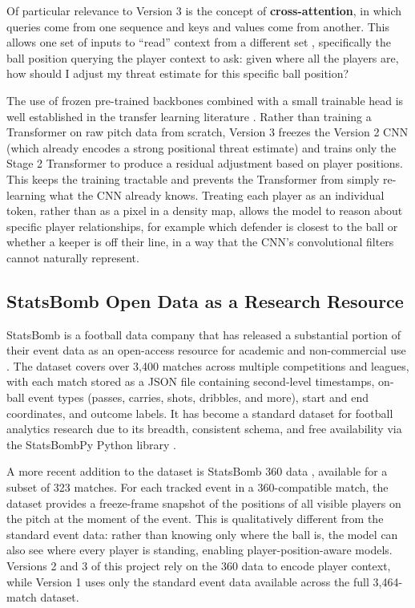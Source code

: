 \documentclass{article}
\begin{document}
Of particular relevance to Version 3 is the concept of \textbf{cross-attention}, in which queries come from one sequence and keys and values come from another. This allows one set of inputs to ``read'' context from a different set , specifically the ball position querying the player context to ask: given where all the players are, how should I adjust my threat estimate for this specific ball position?

The use of frozen pre-trained backbones combined with a small trainable head is well established in the transfer learning literature \cite{devlin2019}. Rather than training a Transformer on raw pitch data from scratch, Version 3 freezes the Version 2 CNN (which already encodes a strong positional threat estimate) and trains only the Stage 2 Transformer to produce a residual adjustment based on player positions. This keeps the training tractable and prevents the Transformer from simply re-learning what the CNN already knows. Treating each player as an individual token, rather than as a pixel in a density map, allows the model to reason about specific player relationships, for example which defender is closest to the ball or whether a keeper is off their line, in a way that the CNN's convolutional filters cannot naturally represent.

\subsection{StatsBomb Open Data as a Research Resource}

StatsBomb is a football data company that has released a substantial portion of their event data as an open-access resource for academic and non-commercial use \cite{statsbomb2018}. The dataset covers over 3,400 matches across multiple competitions and leagues, with each match stored as a JSON file containing second-level timestamps, on-ball event types (passes, carries, shots, dribbles, and more), start and end coordinates, and outcome labels. It has become a standard dataset for football analytics research due to its breadth, consistent schema, and free availability via the StatsBombPy Python library \cite{statsbombpy}.

A more recent addition to the dataset is StatsBomb 360 data \cite{statsbomb360}, available for a subset of 323 matches. For each tracked event in a 360-compatible match, the dataset provides a freeze-frame snapshot of the positions of all visible players on the pitch at the moment of the event. This is qualitatively different from the standard event data: rather than knowing only where the ball is, the model can also see where every player is standing, enabling player-position-aware models. Versions 2 and 3 of this project rely on the 360 data to encode player context, while Version 1 uses only the standard event data available across the full 3,464-match dataset.
\end{document}
